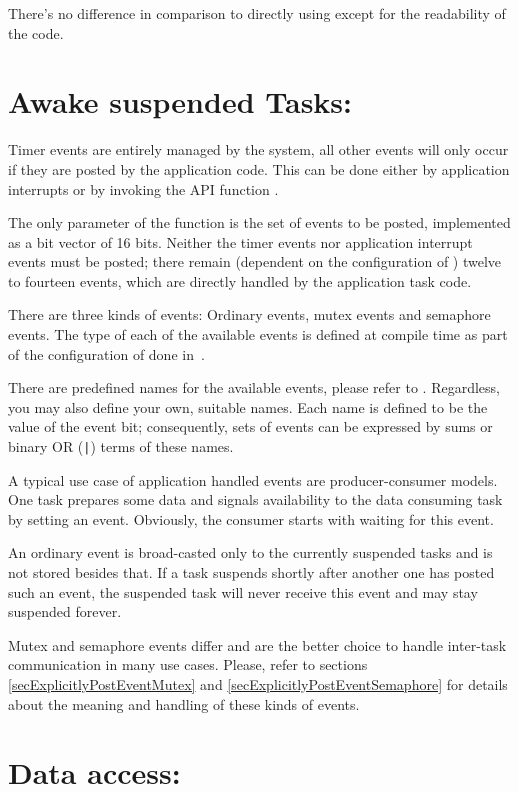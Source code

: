 There's no difference in comparison to directly using
 except for the readability of the code.


\section{Awake suspended Tasks: }

Timer events are entirely managed by the system, all other events will
only occur if they are posted by the application code. This can be done
either by application interrupts or by invoking the API function
.

The only parameter of the function is the set of events to be posted,
implemented as a bit vector of 16 bits. Neither the timer events nor
application interrupt events must be posted; there remain (dependent on
the configuration of \rtos{}) twelve to fourteen events, which are
directly handled by the application task code.

There are three kinds of events: Ordinary events, mutex events and
semaphore events. The type of each of the available events is defined at
compile time as part of the configuration of \rtos{} done in~.

There are predefined names for the available events, please refer to
. Regardless, you may also define your own, suitable names. Each
name is defined to be the value of the event bit; consequently, sets of
events can be expressed by sums or binary OR (\verb+|+) terms of these
names.

A typical use case of application handled events are producer-consumer
models. One task prepares some data and signals availability to the data
consuming task by setting an event. Obviously, the consumer starts with
waiting for this event.

An ordinary event is broad-casted only to the currently suspended tasks
and is not stored besides that. If a task suspends shortly after another
one has posted such an event, the suspended task will never receive this
event and may stay suspended forever.

Mutex and semaphore events differ and are the better choice to handle
inter-task communication in many use cases. Please, refer to sections
\ref{secExplicitlyPostEventMutex} and
\ref{secExplicitlyPostEventSemaphore} for details about the meaning and
handling of these kinds of events.

\section{Data access: }
\label{secEnterLeaveCritSec}

